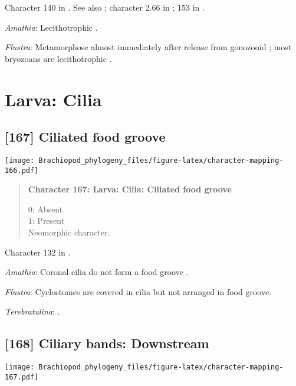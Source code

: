 \documentclass[openany]{book}
\theoremstyle{definition}
\theoremstyle{definition}
\theoremstyle{definition}
\theoremstyle{remark}
\begin{document}
Character 140 in \citet{Rouse1999}. See also \citet{Collin1997};
character 2.66 in \citet{SPS1996}; 153 in \citet{Giribet2002}.

\hypertarget{Amathia-coding-166}{}
\emph{Amathia}: Lecithotrophic \citep{Reed1982}.

\hypertarget{Flustra-coding-166}{}
\emph{Flustra}: Metamorphose almost immediately after release from
gonozooid \citep{Zimmer2013}; most bryozoans are lecithotrophic
\citep{Reed1982}.

\section{Larva: Cilia}\label{larva-cilia}

\subsection*{{[}167{]} Ciliated food groove}\label{ciliated-food-groove}

\texttt{[image: Brachiopod\_phylogeny\_files/figure-latex/character-mapping-166.pdf]}

\begin{quote}
\textbf{Character 167: Larva: Cilia: Ciliated food groove}

0: Absent\\
1: Present\\
Neomorphic character.
\end{quote}

Character 132 in \citet{Rouse1999}.

\hypertarget{Amathia-coding-167}{}
\emph{Amathia}: Coronal cilia do not form a food groove
\citep{Reed1982}.

\hypertarget{Flustra-coding-167}{}
\emph{Flustra}: Cyclostomes are covered in cilia but not arranged in
food groove.

\hypertarget{Terebratulina-coding-167}{}
\emph{Terebratulina}: \citet{Williams1997Introduction}.

\subsection*{{[}168{]} Ciliary bands:
Downstream}\label{ciliary-bands-downstream}

\texttt{[image: Brachiopod\_phylogeny\_files/figure-latex/character-mapping-167.pdf]}
\end{document}
